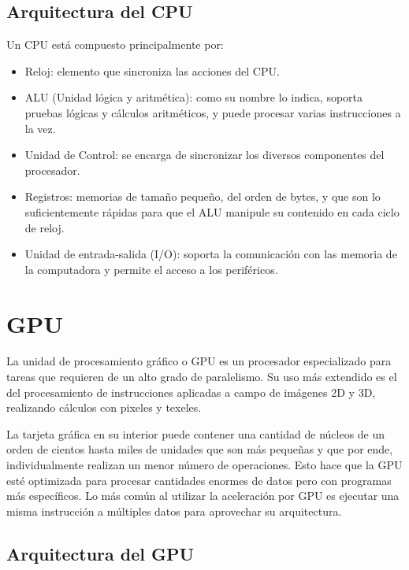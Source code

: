      \subsection{Arquitectura del CPU}

Un CPU está compuesto principalmente por:
\begin{itemize}
\item Reloj: elemento que sincroniza las acciones del CPU.
\item ALU (Unidad lógica y aritmética): como su nombre lo indica, soporta pruebas lógicas y cálculos aritméticos, y puede procesar varias instrucciones a la vez.
\item Unidad de Control: se encarga de sincronizar los diversos componentes del procesador.
\item Registros: memorias de tamaño pequeño, del orden de bytes, y que son lo suficientemente rápidas para que el ALU manipule su contenido en cada ciclo de reloj.
\item Unidad de entrada-salida (I/O): soporta la comunicación con las memoria de la computadora y permite el acceso a los periféricos.
\end{itemize}   

    \section{GPU}
   
    La unidad de procesamiento gráfico o GPU es un procesador especializado para tareas que requieren de un alto grado de paralelismo. Su uso más extendido es el del procesamiento de instrucciones aplicadas a campo de imágenes 2D y 3D, realizando cálculos con pixeles y texeles\cite{TX2CU}.
    
   \vspace{0.3cm}
   
   La tarjeta gráfica en su interior puede contener una cantidad de núcleos de un orden de cientos hasta miles de unidades que son más pequeñas y que por ende, individualmente realizan un menor número de operaciones. Esto hace que la GPU esté optimizada para procesar cantidades enormes de datos pero con programas más específicos\cite{gpgpu}. Lo más común al utilizar la aceleración por GPU es ejecutar una misma instrucción a múltiples datos para aprovechar su arquitectura.
   
    \subsection{Arquitectura del GPU}

